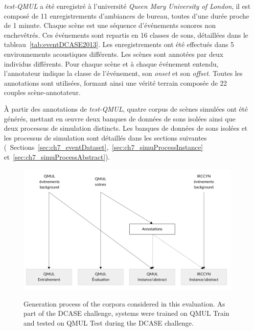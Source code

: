 \emph{test-QMUL} a été enregistré à l'université \emph{Queen Mary University of London}, il est composé de 11 enregistrements d'ambiances de bureau, toutes d'une durée proche de 1 minute. Chaque scène est une séquence  d'événements sonores non enchevêtrés. Ces événements sont repartis en 16 classes de sons, détaillées dans le tableau~\ref{tab:eventDCASE2013}. Les enregistrements ont été effectués dans 5 environnements acoustiques différents. Les scènes sont annotées par deux individus différents. Pour chaque scène et à chaque événement entendu, l'annotateur indique la classe de l'événement, son \emph{onset} et son \emph{offset}.  Toutes les annotations sont utilisées, formant ainsi une vérité terrain composée de 22 couples scène-annotateur.


À partir des annotations de \emph{test-QMUL}, quatre corpus de scènes simulées ont été générés, mettant en œuvre deux banques de données de sons isolées ainsi que deux processus de simulation distincts. Les banques de données de sons isolées et les processus de simulation sont détaillés dans les sections suivantes (\cf~Sections~\ref{sec:ch7_eventDataset},~\ref{sec:ch7_simuProcessInstance} et~\ref{sec:ch7_simuProcessAbstract}). \\


\begin{figure}[t]
\begin{center}
\includegraphics[width=1\textwidth]{gfx/ch_7/databasesTasslp.pdf}
\label{fig:databasesDCASE2013Simu}
\caption{Generation process of the corpora considered in this evaluation. As part of the DCASE challenge, systems were trained on QMUL Train and tested on QMUL Test during the DCASE challenge.} 
\end{center}
\end{figure}

